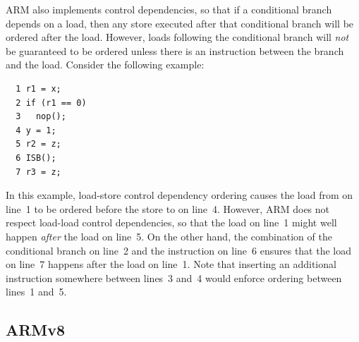ARM also implements control dependencies, so that if a conditional
branch depends on a load, then any store executed after that conditional
branch will be ordered after the load.
However, loads following the conditional branch will \emph{not}
be guaranteed to be ordered unless there is an 
instruction between the branch and the load.
Consider the following example:

\vspace{5pt}
\begin{minipage}[t]{\columnwidth}
\small
\begin{verbatim}
  1 r1 = x;
  2 if (r1 == 0)
  3   nop();
  4 y = 1;
  5 r2 = z;
  6 ISB();
  7 r3 = z;
\end{verbatim}
\end{minipage}
\vspace{5pt}

In this example, load-store control dependency ordering causes
the load from  on line~1 to be ordered before the store to
 on line~4.
However, ARM does not respect load-load control dependencies, so that
the load on line~1 might well happen \emph{after} the
load on line~5.
On the other hand, the combination of the conditional branch on line~2
and the  instruction on line~6 ensures that
the load on line~7 happens after the load on line~1.
Note that inserting an additional  instruction somewhere between
lines~3 and~4 would enforce ordering between lines~1 and~5.

\subsection{ARMv8}

